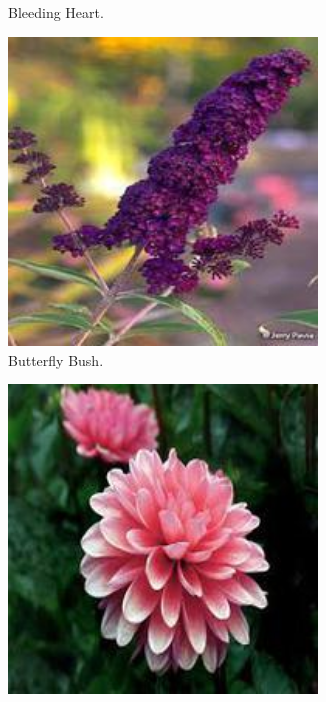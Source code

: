 \begin{figure}
\begin{subfigure}{0.24\textwidth}
        \caption{Bleeding Heart.}
    \end{subfigure}
    \vspace{0.07cm}
    \begin{subfigure}{0.24\textwidth}
        \centering
        \includegraphics[width=0.9\textwidth]{../example_images/ButterflyBush.jpg}
        \caption{Butterfly Bush.}
    \end{subfigure}
    \vspace{0.07cm}
    \begin{subfigure}{0.24\textwidth}
        \centering
        \includegraphics[width=0.9\textwidth]{../example_images/Dahlia.jpg}

\end{subfigure}
\end{figure}
